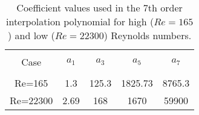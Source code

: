 \begin{table}[ht]

\begin{center}
\setlength{\unitlength}{\textwidth}

\begin{tabular}{c c c c c} %
\hline\hline %
\\[0.2ex]
Case & $a_1$ & $a_3$ & $a_5$ & $a_7$ \\ [0.8ex] %
\hline 
\\[0.8ex]%
Re=165 & 1.3 & 125.3 & 1825.73 & 8765.3 \\[0.8ex] %
Re=22300 & 2.69 & 168 & 1670 & 59900 \\ [1ex] %
\hline %
\end{tabular}

\caption{Coefficient values used in the 7th order interpolation polynomial for high ($Re=165$) and low ($Re=22300$) Reynolds numbers.}
 
\label{table:nonlin} %
\end{center}
\end{table}

